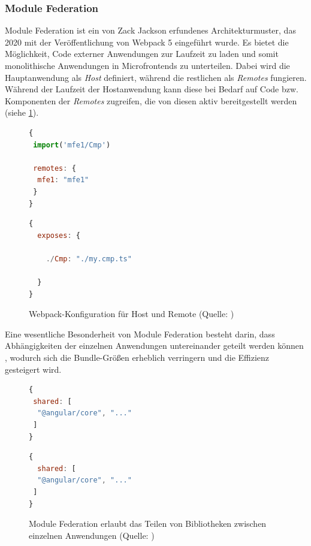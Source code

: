 \subsubsection{Module Federation}
Module Federation ist ein von Zack Jackson erfundenes Architekturmuster, das 2020 mit der Veröffentlichung von Webpack 5 eingeführt wurde. Es bietet die Möglichkeit, Code externer Anwendungen zur Laufzeit zu laden und somit monolithische Anwendungen
in Microfrontends zu unterteilen. Dabei wird die Hauptanwendung als \textit{Host} definiert, während die restlichen als \textit{Remotes} fungieren. Während der Laufzeit der Hostanwendung kann diese bei Bedarf auf Code bzw. Komponenten der \textit{Remotes} zugreifen, die von diesen aktiv bereitgestellt werden (siehe \ref{fig:mf_vergleich_konfig}).
\begin{figure}[H]
  \centering
  \begin{minipage}{0.48\textwidth}
    \begin{lstlisting}[language=javascript, caption={Host}, label={lst:host}]
{
 import('mfe1/Cmp')

 remotes: {
  mfe1: "mfe1"
 }
}
        \end{lstlisting}
  \end{minipage}
  \hfill
  \begin{minipage}{0.48\textwidth}
    \begin{lstlisting}[language=javascript, caption={Remote}, label={lst:remote}]
{
  exposes: {

    ./Cmp: "./my.cmp.ts"

  }
}
        \end{lstlisting}
  \end{minipage}
  \caption{Webpack-Konfiguration für Host und Remote (Quelle: \cite{heise_mf})}
  \label{fig:mf_vergleich_konfig}
\end{figure}


Eine wesentliche Besonderheit von Module Federation besteht darin, dass Abhängigkeiten der einzelnen Anwendungen untereinander geteilt werden können \cite{heise_mf}, wodurch sich die Bundle-Größen erheblich verringern und die Effizienz gesteigert wird.
\begin{figure}[H]
  \centering
  \begin{minipage}{0.48\textwidth}
    \begin{lstlisting}[language=javascript, caption={Host}, label={lst:host_shared}]
{
 shared: [
  "@angular/core", "..."
 ]
}
        \end{lstlisting}
  \end{minipage}
  \hfill
  \begin{minipage}{0.48\textwidth}
    \begin{lstlisting}[language=javascript, caption={Remote}, label={lst:remote_shared}]
{
  shared: [
  "@angular/core", "..."
 ]
}
        \end{lstlisting}
  \end{minipage}
  \caption{Module Federation erlaubt das Teilen von Bibliotheken zwischen einzelnen Anwendungen (Quelle: \cite{heise_mf})}
  \label{fig:mf_vergleich_depend}
\end{figure}